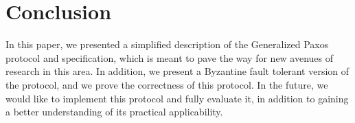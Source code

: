 \section{Conclusion}
\label{sec:conc}
In this paper, we presented a simplified description of the Generalized Paxos protocol and specification, which is meant to pave the way for new avenues of research in this area. In addition, we present a Byzantine fault tolerant version of the protocol, and we prove the correctness of this protocol. In the future, we would like to implement this protocol and fully evaluate it, in addition to gaining a better understanding of its practical applicability.
